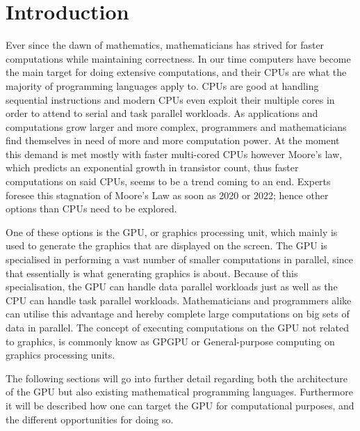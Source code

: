 \chapter{Introduction} %
\label{cha:introduction}
Ever since the dawn of mathematics, mathematicians has strived for faster computations while maintaining correctness.
In our time computers have become the main target for doing extensive computations, and their CPUs are what the majority of programming languages apply to.
CPUs are good at handling sequential instructions and modern CPUs even exploit their multiple cores in order to attend to serial and task parallel workloads.
As applications and computations grow larger and more complex, programmers and mathematicians find themselves in need of more and more computation power.
At the moment this demand is met mostly with faster multi-cored CPUs however Moore's law, which predicts an exponential growth in transistor count, thus faster computations on said CPUs, seems to be a trend coming to an end.
Experts foresee this stagnation of Moore's Law as soon as 2020 or 2022; hence other options than CPUs need to be explored. \citep{Moore2013}

One of these options is the GPU, or graphics processing unit, which mainly is used to generate the graphics that are displayed on the screen.
The GPU is specialised in performing a vast number of smaller computations in parallel, since that essentially is what generating graphics is about.
Because of this specialisation, the GPU can handle data parallel workloads just as well as the CPU can handle task parallel workloads.
Mathematicians and programmers alike can utilise this advantage and hereby complete large computations on big sets of data in parallel.
The concept of executing computations on the GPU not related to graphics, is commonly know as GPGPU or General-purpose computing on graphics processing units. 

The following sections will go into further detail regarding both the architecture of the GPU but also existing mathematical programming languages.
Furthermore it will be described how one can target the GPU for computational purposes, and the different opportunities for doing so. 



